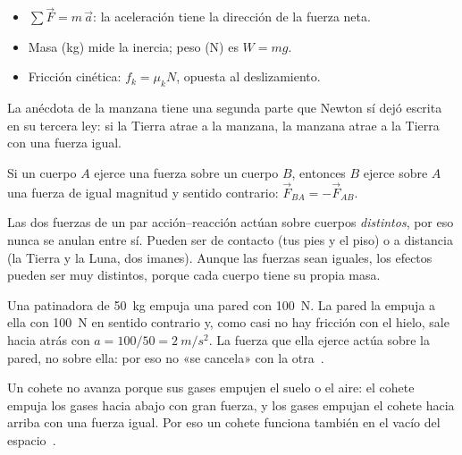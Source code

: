 \documentclass[11pt]{article}
\begin{document}
\begin{resumen}
\begin{itemize}
  \item $\sum \vec F = m\,\vec a$: la aceleración tiene la dirección de la fuerza neta.
  \item Masa (kg) mide la inercia; peso (N) es $W = mg$.
  \item Fricción cinética: $f_k = \mu_k N$, opuesta al deslizamiento.
\end{itemize}
\end{resumen}

\label{tema:terceraley}

\begin{hilo}
La anécdota de la manzana tiene una segunda parte que Newton sí dejó escrita en su tercera ley:
si la Tierra atrae a la manzana, la manzana atrae a la Tierra con una fuerza igual.
\end{hilo}

\begin{teorema}
Si un cuerpo $A$ ejerce una fuerza sobre un cuerpo $B$, entonces $B$ ejerce sobre $A$ una
fuerza de igual magnitud y sentido contrario: $\vec F_{BA} = -\vec F_{AB}$.
\end{teorema}

Las dos fuerzas de un par acción--reacción actúan sobre cuerpos \emph{distintos}, por eso nunca
se anulan entre sí. Pueden ser de contacto (tus pies y el piso) o a distancia (la Tierra y la
Luna, dos imanes). Aunque las fuerzas sean iguales, los efectos pueden ser muy distintos,
porque cada cuerpo tiene su propia masa.

\begin{ejemplo}
Una patinadora de \qty{50}{kg} empuja una pared con \qty{100}{N}. La pared la empuja a ella con
\qty{100}{N} en sentido contrario y, como casi no hay fricción con el hielo, sale hacia atrás
con $a = 100/50 = \qty{2}{m/s^2}$. La fuerza que ella ejerce actúa sobre la pared, no sobre
ella: por eso no «se cancela» con la otra~\cite{recurso10}.
\end{ejemplo}

\begin{aplicacion}
Un cohete no avanza porque sus gases empujen el suelo o el aire: el cohete empuja los gases
hacia abajo con gran fuerza, y los gases empujan el cohete hacia arriba con una fuerza igual.
Por eso un cohete funciona también en el vacío del espacio~\cite{recurso10}.
\end{aplicacion}
\end{document}

